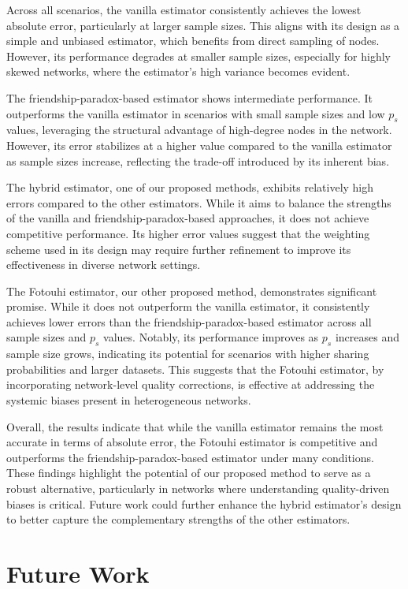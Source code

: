 \documentclass{article}
\begin{document}
Across all scenarios, the vanilla estimator consistently achieves the lowest absolute error, particularly at larger sample sizes. This aligns with its design as a simple and unbiased estimator, which benefits from direct sampling of nodes. However, its performance degrades at smaller sample sizes, especially for highly skewed networks, where the estimator's high variance becomes evident.

The friendship-paradox-based estimator shows intermediate performance. It outperforms the vanilla estimator in scenarios with small sample sizes and low $p_s$ values, leveraging the structural advantage of high-degree nodes in the network. However, its error stabilizes at a higher value compared to the vanilla estimator as sample sizes increase, reflecting the trade-off introduced by its inherent bias.

The hybrid estimator, one of our proposed methods, exhibits relatively high errors compared to the other estimators. While it aims to balance the strengths of the vanilla and friendship-paradox-based approaches, it does not achieve competitive performance. Its higher error values suggest that the weighting scheme used in its design may require further refinement to improve its effectiveness in diverse network settings.

The Fotouhi estimator, our other proposed method, demonstrates significant promise. While it does not outperform the vanilla estimator, it consistently achieves lower errors than the friendship-paradox-based estimator across all sample sizes and $p_s$ values. Notably, its performance improves as $p_s$ increases and sample size grows, indicating its potential for scenarios with higher sharing probabilities and larger datasets. This suggests that the Fotouhi estimator, by incorporating network-level quality corrections, is effective at addressing the systemic biases present in heterogeneous networks.

Overall, the results indicate that while the vanilla estimator remains the most accurate in terms of absolute error, the Fotouhi estimator is competitive and outperforms the friendship-paradox-based estimator under many conditions. These findings highlight the potential of our proposed method to serve as a robust alternative, particularly in networks where understanding quality-driven biases is critical. Future work could further enhance the hybrid estimator's design to better capture the complementary strengths of the other estimators.

\section{Future Work}
\end{document}
